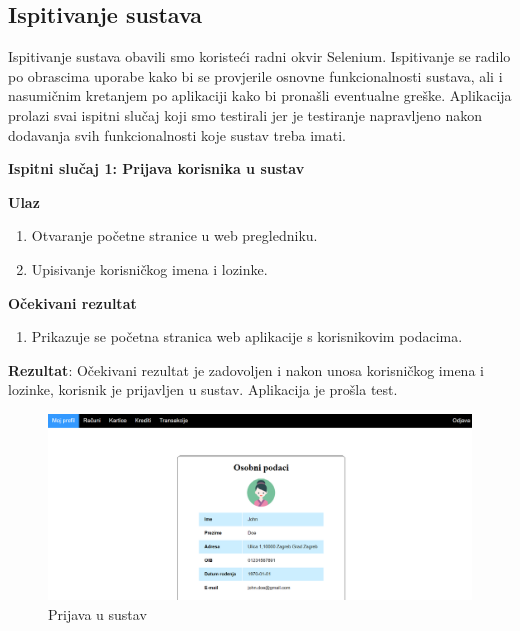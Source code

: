 			
			
			\subsection{Ispitivanje sustava}
			
			 Ispitivanje sustava obavili smo koristeći radni okvir Selenium. Ispitivanje se radilo po obrascima uporabe kako bi se provjerile osnovne funkcionalnosti sustava, ali i nasumičnim kretanjem po aplikaciji kako bi pronašli eventualne greške. Aplikacija prolazi svai ispitni slučaj koji smo testirali jer je testiranje napravljeno nakon dodavanja svih funkcionalnosti koje sustav treba imati.
			 
			 \text{}
			 
			 
		 	\textbf{Ispitni slučaj 1: Prijava korisnika u sustav} 
		 	
		 	\textbf{Ulaz}
		 	
		 	\begin{enumerate}
		 		
		 		\item Otvaranje početne stranice u web pregledniku.
		 		\item Upisivanje korisničkog imena i lozinke.
		 	\end{enumerate}
	 	
	 		\textbf{Očekivani rezultat}
	 		
	 		\begin{enumerate}
	 			\item Prikazuje se početna stranica web aplikacije s korisnikovim podacima.
	 		\end{enumerate}
			
			\textbf{Rezultat}: Očekivani rezultat je zadovoljen i nakon unosa korisničkog imena i lozinke, korisnik je prijavljen u sustav. Aplikacija je prošla test.
			
			\begin{figure}[H]
				\includegraphics[scale=0.4]{slike/prijava.PNG}
				\centering
				\caption{Prijava u sustav}
				\label{fig:prijava}
			\end{figure}
		
